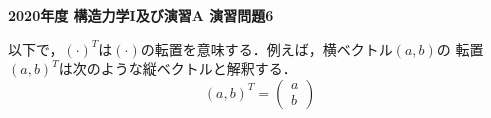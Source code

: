 \documentclass[10pt,a4j]{jarticle}
\newlength{\minitwocolumn}
\begin{document}
\newcommand{\fat}[1]{\mbox{\boldmath $#1$}}
\newcommand{\D}{\partial}
\newcommand{\w}{\omega}
\newcommand{\ga}{\alpha}
\newcommand{\gb}{\beta}
\newcommand{\gx}{\xi}
\newcommand{\gz}{\zeta}
\newcommand{\vhat}[1]{\hat{\fat{#1}}}
\newcommand{\spc}{\vspace{0.7\baselineskip}}
\newcommand{\halfspc}{\vspace{0.3\baselineskip}}

\pagestyle{empty}
\newcommand{\twofig}[2]
 {
   \begin{figure}[h]
     \begin{minipage}[t]{\minitwocolumn}
         \begin{center}   #1
         \end{center}
     \end{minipage}
         \hspace{\columnsep}
     \begin{minipage}[t]{\minitwocolumn}
         \begin{center} #2
         \end{center}
     \end{minipage}
   \end{figure}
 }
\begin{center}
{\Large \bf2020年度 構造力学I及び演習A 演習問題6}
\end{center}
以下で，$(\cdot)^T$は$(\cdot)$の転置を意味する．例えば，横ベクトル$(a,b)$の
転置$(a,b)^T$は次のような縦ベクトルと解釈する．
\begin{equation}
	(a,b)^T=\left(
	\begin{array}{c}
		a \\
		b
	\end{array}
	\right)
	\nonumber
\end{equation}
\end{document}
